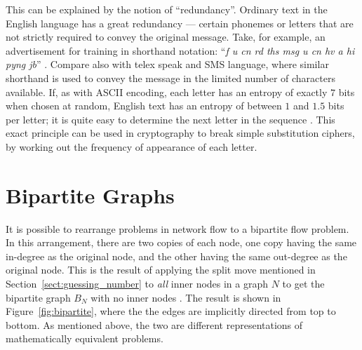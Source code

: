 This can be explained by the notion of ``redundancy''. Ordinary text in the English language has a great redundancy --- certain phonemes or letters that are not strictly required to convey the original message. Take, for example, an advertisement for training in shorthand notation: ``\emph{f u cn rd ths msg u cn hv a hi pyng jb}'' \cite{glei1990}. Compare also with telex speak and SMS language, where similar shorthand is used to convey the message in the limited number of characters available. If, as with ASCII encoding, each letter has an entropy of exactly $7$ bits when chosen at random, English text has an entropy of between $1$ and $1.5$ bits per letter; it is quite easy to determine the next letter in the sequence \cite{schn1996}. This exact principle can be used in cryptography to break simple substitution ciphers, by working out the frequency of appearance of each letter.

\section{Bipartite Graphs}
\label{sect:bipartite}

It is possible to rearrange problems in network flow to a bipartite flow problem. In this arrangement, there are two copies of each node, one copy having the same in-degree as the original node, and the other having the same out-degree as the original node. This is the result of applying the split move mentioned in Section~\ref{sect:guessing_number} to \emph{all} inner nodes in a graph $N$ to get the bipartite graph $B_N$ with no inner nodes \cite{riis2005util}. The result is shown in Figure~\ref{fig:bipartite}, where the the edges are implicitly directed from top to bottom. As mentioned above, the two are different representations of mathematically equivalent problems.

